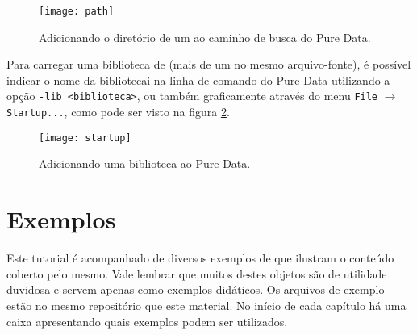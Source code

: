 \begin{figure}[h!]
  \centering
  \texttt{[image: path]}
  \caption{Adicionando o diretório de um \external ao caminho de busca do Pure Data.}
  \label{fig:search-path}
\end{figure}

Para carregar uma biblioteca de \externals (mais de um \external no mesmo
arquivo-fonte), é possível indicar o nome da bibliotecai na linha
de comando do Pure Data utilizando a opção \texttt{-lib <biblioteca>}, ou
também graficamente através do menu \texttt{File} $\rightarrow$
\texttt{Startup...}, como pode ser visto na figura \ref{fig:lib}.

\begin{figure}[h!]
  \centering
  \texttt{[image: startup]}
  \caption{Adicionando uma biblioteca ao Pure Data.}
  \label{fig:lib}
\end{figure}

\section{Exemplos}
Este tutorial é acompanhado de diversos exemplos de \externals que ilustram o
conteúdo coberto pelo mesmo.
Vale lembrar que muitos destes objetos são de utilidade duvidosa e servem apenas
como exemplos didáticos.
Os arquivos de exemplo estão no mesmo repositório que este material.
No início de cada capítulo há uma caixa apresentando quais exemplos podem ser
utilizados.
